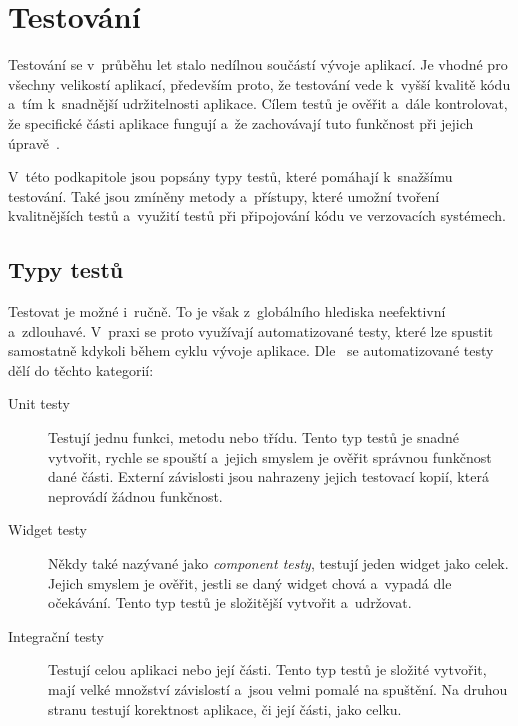 \section{Testování}

Testování se v~průběhu let stalo nedílnou součástí vývoje aplikací.
Je vhodné pro všechny velikostí aplikací,
především proto,
že testování vede k~vyšší kvalitě kódu
a~tím k~snadnější udržitelnosti aplikace.
Cílem testů je ověřit a~dále kontrolovat,
že specifické části aplikace fungují
a~že zachovávají tuto funkčnost při jejich úpravě~\cite{testing_quality}.
\emph{}~\cite[str.~31]{martin_clean_architecture}

V~této podkapitole jsou popsány typy testů,
které pomáhají k~snažšímu testování.
Také jsou zmíněny metody a~přístupy,
které umožní tvoření kvalitnějších testů
a~využití testů při připojování kódu ve verzovacích systémech.

\subsection{Typy testů}

Testovat je možné i~ručně.
To je však z~globálního hlediska neefektivní a~zdlouhavé.
V~praxi se proto využívají automatizované testy,
které lze spustit samostatně kdykoli během cyklu vývoje
aplikace.
Dle~\cite{testing_flutter} se automatizované testy dělí do těchto kategorií:

\begin{description}
    \item[Unit testy] Testují jednu funkci, metodu nebo třídu.
    Tento typ testů je snadné vytvořit,
    rychle se spouští
    a~jejich smyslem je ověřit správnou funkčnost dané části.
    Externí závislosti jsou nahrazeny jejich testovací kopií,
    která neprovádí žádnou funkčnost.
    \item[Widget testy] Někdy také nazývané jako \emph{component testy},
    testují jeden widget jako celek.
    Jejich smyslem je ověřit,
    jestli se daný widget chová a~vypadá dle očekávání.
    Tento typ testů je složitější vytvořit a~udržovat.
    \item[Integrační testy] Testují celou aplikaci nebo její části.
    Tento typ testů je složité vytvořit,
    mají velké množství závislostí a~jsou velmi pomalé na spuštění.
    Na druhou stranu testují korektnost aplikace,
    či její části,
    jako celku.
\end{description}


